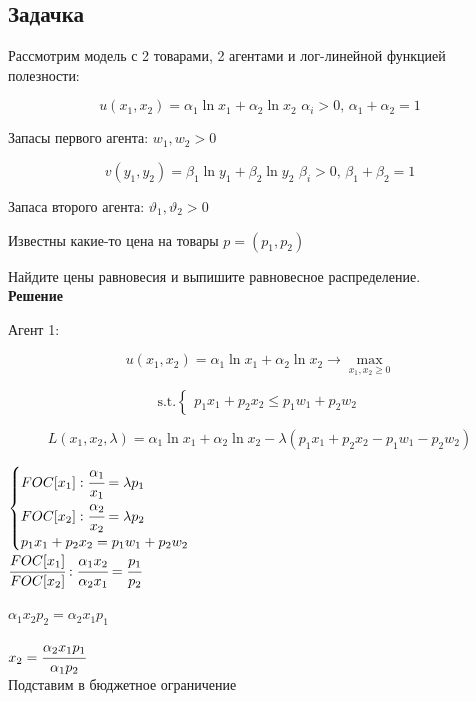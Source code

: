 \documentclass[reqno]{article}
\theoremstyle{definition}
\theoremstyle{definition}
\theoremstyle{definition}
\theoremstyle{definition}
\theoremstyle{definition}
\theoremstyle{definition}
\theoremstyle{definition}
\theoremstyle{definition}
\theoremstyle{definition}
\begin{document}
			\subsection{Задачка}
			
			Рассмотрим модель с 2 товарами, 2 агентами и лог-линейной функцией полезности:
			
			$$u(x_1, x_2) = \alpha_1 \ln x_1 + \alpha_2 \ln x_2 \, \, \alpha_i>0, \, \alpha_1+\alpha_2=1$$
			
			Запасы первого агента: $w_1,w_2 > 0$
			
			$$v(y_1, y_2) = \beta_1 \ln y_1 + \beta_2 \ln y_2 \, \, \beta_i>0, \, \beta_1+\beta_2=1$$
			
			Запаса второго агента: $\vartheta_1, \vartheta_2 > 0$
			
			Известны какие-то цена на товары $p = (p_1,p_2)$
			
			Найдите цены равновесия и выпишите равновесное распределение.\\
			
			\textbf{Решение}
			
			Агент 1:
			
			$$u(x_1, x_2) = \alpha_1 \ln x_1 + \alpha_2 \ln x_2 \rightarrow \max_{x_1,x_2 \geq 0}$$
			
			$$
			\text{s.t.}
			\begin{cases}
				p_1x_1+p_2x_2 \leq p_1w_1 + p_2w_2
			\end{cases}
			$$
			
			$$L(x_1,x_2,\lambda)=\alpha_1 \ln x_1 + \alpha_2 \ln x_2 - \lambda(p_1x_1+p_2x_2 - p_1w_1 - p_2w_2)$$
			
			$
			\begin{cases}
				FOC[x_1]: \cfrac{\alpha_1}{x_1} = \lambda p_1\\
				
				FOC[x_2]: \cfrac{\alpha_2}{x_2}  = \lambda p_2\\
				
				p_1x_1+p_2x_2 = p_1w_1+p_2w_2
			\end{cases}
			$ \\
			
			$\cfrac{FOC[x_1]}{FOC[x_2]}: \cfrac{\alpha_1 x_2}{\alpha_2 x_1} = \cfrac{p_1}{p_2}$
			
			$\alpha_1 x_2 p_2 = \alpha_2 x_1 p_1$
			
			$x_2 = \cfrac{\alpha_2 x_1 p_1}{\alpha_1 p_2}$ \\
			
			Подставим в бюджетное ограничение
			
\end{document}
